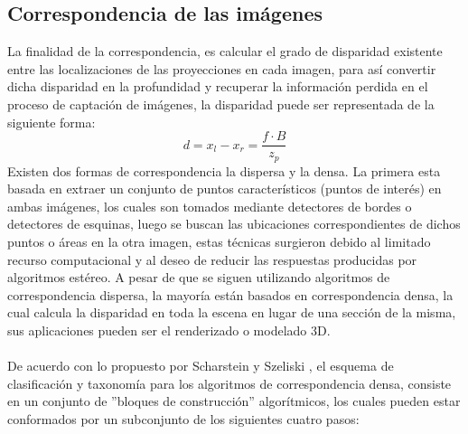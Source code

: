 \subsection{Correspondencia de las imágenes}
La finalidad de la correspondencia, es calcular el grado de disparidad existente entre las localizaciones de las proyecciones en cada imagen, para así convertir dicha disparidad en la profundidad y recuperar la información perdida en el proceso de captación de imágenes, la disparidad puede ser representada de la siguiente forma:
\begin{equation}
d = x_{l} - x_{r} = \frac{f\cdot B}{z_{p}}
\end{equation}
Existen dos formas de correspondencia la dispersa y la densa. La primera esta basada en extraer un conjunto de puntos característicos (puntos de interés) en ambas imágenes, los cuales son tomados mediante detectores de bordes o detectores de esquinas, luego se buscan las ubicaciones correspondientes de dichos puntos o áreas en la otra imagen, estas técnicas surgieron debido al limitado recurso computacional y al deseo de reducir las respuestas producidas por algoritmos estéreo. A pesar de que se siguen utilizando algoritmos de correspondencia dispersa, la mayoría están basados en correspondencia densa, la cual calcula la disparidad en toda la escena en lugar de una sección de la misma, sus aplicaciones pueden ser el renderizado o modelado 3D. 
\\
\\
De acuerdo con lo propuesto por Scharstein y Szeliski \cite{Scharstein2002}, el esquema de clasificación y taxonomía para los algoritmos de correspondencia densa, consiste en un conjunto de ''bloques de construcción'' algorítmicos, los cuales pueden estar conformados por un subconjunto de los siguientes cuatro pasos:
